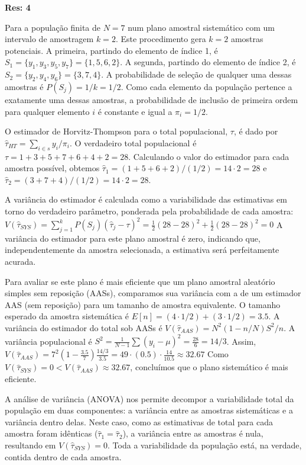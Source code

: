 \documentclass[a4paper,11pt,oneside,twocolumn]{Config/milktest}
\begin{document}
	\medskip
	{\scriptsize  {\bf Res: 4}
		
		Para a população finita de $N=7$ num plano amostral sistemático com um intervalo de amostragem $k=2$. Este procedimento gera $k=2$ amostras potenciais. A primeira, partindo do elemento de índice 1, é $S_1 = \{y_1, y_3, y_5, y_7\} = \{1, 5, 6, 2\}$. A segunda, partindo do elemento de índice 2, é $S_2 = \{y_2, y_4, y_6\} = \{3, 7, 4\}$. A probabilidade de seleção de qualquer uma dessas amostras é $P(S_j) = 1/k = 1/2$. Como cada elemento da população pertence a exatamente uma dessas amostras, a probabilidade de inclusão de primeira ordem para qualquer elemento $i$ é constante e igual a $\pi_i = 1/2$.
		
		O estimador de Horvitz-Thompson para o total populacional, $\tau$, é dado por $\hat{\tau}_{HT} = \sum_{i \in s} y_i / \pi_i$. O verdadeiro total populacional é $\tau = 1+3+5+7+6+4+2 = 28$. Calculando o valor do estimador para cada amostra possível, obtemos $\hat{\tau}_1 = (1+5+6+2)/(1/2) = 14 \cdot 2 = 28$ e $\hat{\tau}_2 = (3+7+4)/(1/2) = 14 \cdot 2 = 28$.
		
		A variância do estimador é calculada como a variabilidade das estimativas em torno do verdadeiro parâmetro, ponderada pela probabilidade de cada amostra:
		$ V(\hat{\tau}_{SYS}) = \sum_{j=1}^{k} P(S_j) (\hat{\tau}_j - \tau)^2 = \frac{1}{2}(28 - 28)^2 + \frac{1}{2}(28 - 28)^2 = 0 $
		A variância do estimador para este plano amostral é zero, indicando que, independentemente da amostra selecionada, a estimativa será perfeitamente acurada.
		
		Para avaliar se este plano é mais eficiente que um plano amostral aleatório simples sem reposição (AASs), comparamos sua variância com a de um estimador AAS (sem reposição) para um tamanho de amostra equivalente. O tamanho esperado da amostra sistemática é $E[n] = (4 \cdot 1/2) + (3 \cdot 1/2) = 3.5$. A variância do estimador do total sob AASs é $V(\hat{\tau}_{AAS}) = N^2 (1 - n/N) S^2/n$. A variância populacional é $S^2 = \frac{1}{N-1}\sum(y_i - \mu)^2 = \frac{28}{6} = 14/3$. Assim,
		$ V(\hat{\tau}_{AAS}) = 7^2 \left(1 - \frac{3.5}{7}\right) \frac{14/3}{3.5} = 49 \cdot (0.5) \cdot \frac{14}{10.5} \approx 32.67 $
		Como $V(\hat{\tau}_{SYS}) = 0 < V(\hat{\tau}_{AAS}) \approx 32.67$, concluímos que o plano sistemático é  mais eficiente.
		
		A análise de variância (ANOVA) nos permite decompor a variabilidade total da população em duas componentes: a variância entre as amostras sistemáticas e a variância dentro delas. Neste caso, como as estimativas de total para cada amostra foram idênticas ($\hat{\tau}_1 = \hat{\tau}_2$), a variância entre as amostras é nula, resultando em $V(\hat{\tau}_{SYS})=0$. Toda a variabilidade da população está, na verdade, contida dentro de cada amostra.
		
}
\end{document}
